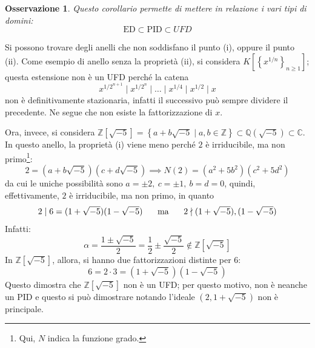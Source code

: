 \documentclass[12pt]{scrartcl}
\theoremstyle{style}
\newtheorem{osservazione}{Osservazione}[section]
\numberwithin{equation}{subsection}
\begin{document}
\begin{osservazione}
Questo corollario permette di mettere in relazione i vari tipi di domini:
\[
\text{ED} \subset \text{PID}\subset UFD
\] 
\end{osservazione}
\noindent Si possono trovare degli anelli che non soddisfano il punto (i), oppure il punto (ii).
Come esempio di anello senza la propriet\`a (ii), si considera $K[\left\{ x^{1 / n}  \right\} _{n\ge 1} ]$; questa estensione non \`e un UFD perch\'e la catena
\[
x^{1/2^{n+1} }  \mid x^{1 / 2^n}  \mid \ldots  \mid x^{1 / 4}  \mid x ^{ 1 / 2}   \mid  x
\] 
non \`e definitivamente stazionaria, infatti il successivo pu\`o sempre dividere il precedente.
Ne segue che non esiste la fattorizzazione di $x$.

Ora, invece, si considera $\mathbb{Z}[\sqrt{-5} ] = \left\{ a + b\sqrt{-5}  \mid a,b \in \mathbb{Z} \right\} \subset \mathbb{Q}(\sqrt{-5} ) \subset \mathbb{C}$.
In questo anello, la propriet\`a (i) viene meno perch\'e $2$ \`e irriducibile, ma non primo\footnote{Qui, $N$ indica la funzione grado.}:
\[
2 = (a + b\sqrt{-5} )(c+d\sqrt{-5} ) \implies N(2) = (a^2 + 5b^2 ) (c^2 + 5d^2)
\] 
da cui le uniche possibilit\`a sono $a = \pm 2, \ c= \pm 1, \ b = d = 0$, quindi, effettivamente, $2$ \`e irriducibile, ma non primo, in quanto 
\[
2  \mid 6 = (1 + \sqrt{-5} ) ( 1-\sqrt{-5} ) \hspace{.5cm} \text{ ma } \hspace{.5cm} 2 \nmid (1+\sqrt{-5} ) , (1-\sqrt{-5} )
\] 
Infatti:
\[
	\alpha  = \frac{1\pm\sqrt{-5} }{2} = \frac{1}{2} \pm \frac{\sqrt{-5} }{2}\not \in \mathbb{Z}[\sqrt{-5} ]
\] 
In $\mathbb{Z}[\sqrt{-5} ]$, allora, si hanno due fattorizzazioni distinte per $6$:
\[
6 = 2\cdot 3 = (1+\sqrt{-5} ) (1-\sqrt{-5} )
\] 
Questo dimostra che $\mathbb{Z}[\sqrt{-5} ]$ non \`e un UFD; per questo motivo, non \`e neanche un PID e questo si pu\`o dimostrare notando l'ideale $(2, 1+\sqrt{-5} )$ non \`e principale.
\end{document}
